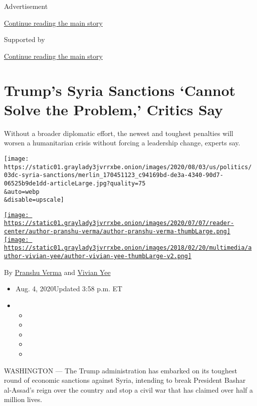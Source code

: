 Advertisement

\protect\hyperlink{after-top}{Continue reading the main story}

Supported by

\protect\hyperlink{after-sponsor}{Continue reading the main story}

\hypertarget{trumps-syria-sanctions-cannot-solve-the-problem-critics-say}{%
\section{Trump's Syria Sanctions `Cannot Solve the Problem,' Critics
Say}\label{trumps-syria-sanctions-cannot-solve-the-problem-critics-say}}

Without a broader diplomatic effort, the newest and toughest penalties
will worsen a humanitarian crisis without forcing a leadership change,
experts say.

\texttt{[image: https://static01.graylady3jvrrxbe.onion/images/2020/08/03/us/politics/03dc-syria-sanctions/merlin\_170451123\_c94169bd-de3a-4340-90d7-06525b9de1dd-articleLarge.jpg?quality=75\\\&auto=webp\\\&disable=upscale]}

\href{https://www.nytimes3xbfgragh.onion/by/pranshu-verma}{\texttt{[image: https://static01.graylady3jvrrxbe.onion/images/2020/07/07/reader-center/author-pranshu-verma/author-pranshu-verma-thumbLarge.png]}}\href{https://www.nytimes3xbfgragh.onion/by/vivian-yee}{\texttt{[image: https://static01.graylady3jvrrxbe.onion/images/2018/02/20/multimedia/author-vivian-yee/author-vivian-yee-thumbLarge-v2.png]}}

By \href{https://www.nytimes3xbfgragh.onion/by/pranshu-verma}{Pranshu
Verma} and
\href{https://www.nytimes3xbfgragh.onion/by/vivian-yee}{Vivian Yee}

\begin{itemize}
\item
  Aug. 4, 2020Updated 3:58 p.m. ET
\item
  \begin{itemize}
  \item
  \item
  \item
  \item
  \item
  \end{itemize}
\end{itemize}

WASHINGTON --- The Trump administration has embarked on its toughest
round of economic sanctions against Syria, intending to break President
Bashar al-Assad's reign over the country and stop a civil war that has
claimed over half a million lives.

